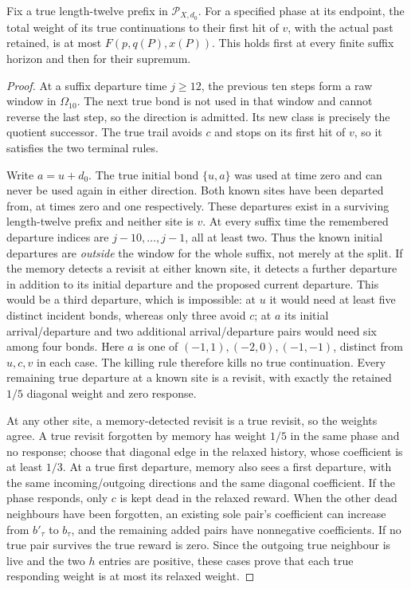 \begin{lemma}
\label{hl:suffix}
Fix a true length-twelve prefix in $\mathcal P_{X,d_0}$.
For a specified phase at its endpoint, the total weight of its
true continuations to their first hit of $v$, with the actual
past retained, is at most $F(p,q(P),x(P))$.  This holds first
at every finite suffix horizon and then for their supremum.
\end{lemma}

\begin{proof}
At a suffix departure time $j\ge12$, the previous ten steps
form a raw window in $\Omega_{10}$.  The next true bond is
not used in that window and cannot reverse the last step, so
the direction is admitted.  Its new class is precisely the
quotient successor.  The true trail avoids $c$ and stops on its
first hit of $v$, so it satisfies the two terminal rules.

Write $a=u+d_0$.  The true initial bond $\{u,a\}$ was used at
time zero and can never be used again in either direction.
Both known sites have been departed from, at times zero and
one respectively.  These departures exist in a surviving
length-twelve prefix and neither site is $v$.  At every suffix
time the remembered departure indices are $j-10,\ldots,j-1$,
all at least two.  Thus the known initial departures are
\emph{outside} the window for the whole suffix, not merely at
the split.  If the memory detects a revisit at either known
site, it detects a further departure in addition to its initial
departure and the proposed current departure.  This would be a
third departure, which is impossible: at $u$ it would need at
least five distinct incident bonds, whereas only three avoid
$c$; at $a$ its initial arrival/departure and two additional
arrival/departure pairs would need six among four bonds.
Here $a$ is one of $(-1,1),(-2,0),(-1,-1)$, distinct from
$u,c,v$ in each case.  The killing rule therefore kills no
true continuation.  Every remaining true departure at a known
site is a revisit, with exactly the retained $1/5$ diagonal
weight and zero response.

At any other site, a memory-detected revisit is a true revisit,
so the weights agree.  A true revisit forgotten by memory has
weight $1/5$ in the same phase and no response; choose that
diagonal edge in the relaxed history, whose coefficient is at
least $1/3$.  At a true first departure, memory also sees a
first departure, with the same incoming/outgoing directions
and the same diagonal coefficient.  If the phase responds,
only $c$ is kept dead in the relaxed reward.  When the other
dead neighbours have been forgotten, an existing sole pair's
coefficient can increase from $b'_\tau$ to $b_\tau$, and the
remaining added pairs have nonnegative coefficients.  If no
true pair survives the true reward is zero.  Since the
outgoing true neighbour is live and the two $h$ entries are
positive, these cases prove that each true responding weight
is at most its relaxed weight.


\end{proof}
